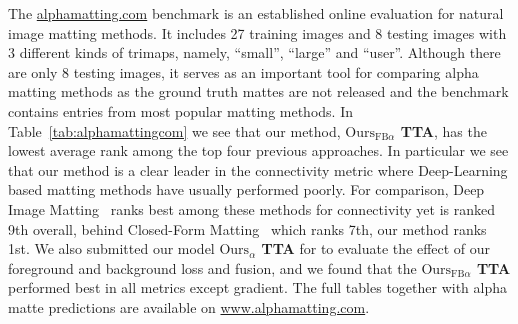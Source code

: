 \documentclass[runningheads]{llncs}
\begin{document}
The \url{alphamatting.com} benchmark is an established online evaluation for natural image matting methods. It includes 27 training images and 8 testing images with 3 different kinds of trimaps, namely, “small”, “large” and “user”. Although there are only 8 testing images, it serves as an important tool for comparing alpha matting methods as the ground truth mattes are not released and the benchmark contains entries from most popular matting methods. In Table~\ref{tab:alphamattingcom} we see that our method, \textbf{$\text{Ours}_{\mathrm{FB}\alpha}$ TTA}, has the lowest average rank among the top four previous approaches. In particular we see that our method is a clear leader in the connectivity metric where Deep-Learning based matting methods have usually performed poorly. For comparison, Deep Image Matting~\cite{DeepImageMatting} ranks best among these methods for connectivity yet is ranked 9th overall, behind Closed-Form Matting~\cite{ClosedFormMattingPAMI} which ranks 7th, our method ranks 1st. We also submitted our model \textbf{$\text{Ours}_{\alpha}$ TTA} for to evaluate the effect of our foreground and background loss and fusion, and we found that the \textbf{$\text{Ours}_{\mathrm{FB}\alpha}$ TTA} performed best in all metrics except gradient. The full tables together with alpha matte predictions are available on \url{www.alphamatting.com}. 
\end{document}
